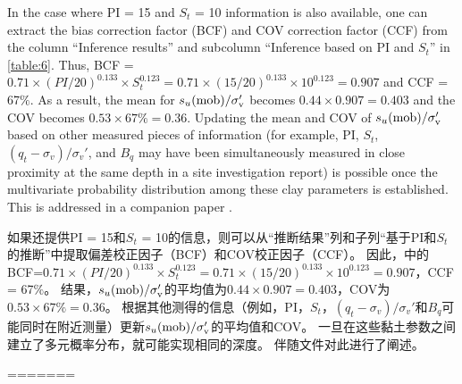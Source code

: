 \begin{paracol}{2}
    In the case where PI = 15 and $S_t$ = 10 information is also available, one can extract the bias correction factor (BCF) and COV correction factor (CCF) from the column “Inference results” and subcolumn “Inference based on PI and $S_t$” in \autoref{table:6}. Thus, BCF = $0.71\times{}(PI/20)^{0.133}\times{}S_t^{0.123} = 0.71\times{}(15/20)^{0.133}\times{}10^{0.123} = 0.907$ and CCF = 67$\%$. As a result, the mean for $s_u(\rm{mob})/\sigma_v'$ becomes $0.44\times{}0.907 = 0.403$ and the COV becomes $0.53\times{}67\%= 0.36$. Updating the mean and COV of $s_u(\rm{mob})/\sigma_v'$ based on other measured pieces of information (for example, PI, $S_t$, $(q_t-\sigma_v)/\sigma_v'$, and $B_q$ may have been simultaneously measured in close proximity at the same depth in a site investigation report) is possible once the multivariate probability distribution among these clay parameters is established. This is addressed in a companion paper \citep{Ching2014686}.
        
    \switchcolumn
    
    如果还提供PI = 15和$S_t$ = 10的信息，则可以从“推断结果”列和子列“基于PI和$S_t$的推断”中提取偏差校正因子（BCF）和COV校正因子（CCF）。 因此，中的BCF=$0.71\times{}(PI/20)^{0.133}\times{}S_t^{0.123} = 0.71\times{}(15/20)^{0.133}\times{}10^{0.123} = 0.907$，CCF = 67$\%$。 结果，$s_u(\rm{mob})/\sigma_v'$的平均值为$0.44\times{}0.907 = 0.403$，COV为$0.53\times{}67\%= 0.36$。 根据其他测得的信息（例如，PI，$S_t$，$(q_t-\sigma_v)/\sigma_v'$和$B_q$可能同时在附近测量）更新$s_u(\rm{mob})/\sigma_v'$的平均值和COV。 一旦在这些黏土参数之间建立了多元概率分布，就可能实现相同的深度。 伴随文件对此进行了阐述\citep{Ching2014686}。
        
\end{paracol}
=======
